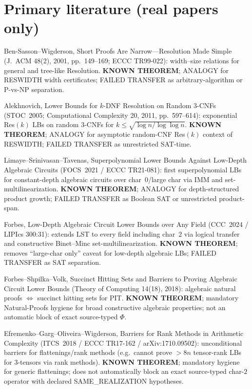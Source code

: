 \documentclass[11pt]{article}
\begin{document}
\section*{Primary literature (real papers only)}
Ben-Sasson--Wigderson, Short Proofs Are Narrow---Resolution Made Simple (J.\ ACM 48(2),
2001, pp.~149--169; ECCC TR99-022): width--size relations for general and tree-like Resolution.
\textbf{KNOWN THEOREM}; ANALOGY for RESWIDTH width certificates; FAILED TRANSFER as
arbitrary-algorithm or P-vs-NP separation.

Alekhnovich, Lower Bounds for $k$-DNF Resolution on Random 3-CNFs (STOC~2005;
Computational Complexity 20, 2011, pp.~597--614): exponential Res$(k)$ LBs on random 3-CNFs
for $k\le\sqrt{\log n/\log\log n}$. \textbf{KNOWN THEOREM}; ANALOGY for asymptotic random-CNF
Res$(k)$ context of RESWIDTH; FAILED TRANSFER as unrestricted SAT-time.

Limaye--Srinivasan--Tavenas, Superpolynomial Lower Bounds Against Low-Depth Algebraic Circuits
(FOCS~2021 / ECCC TR21-081): first superpolynomial LBs for constant-depth algebraic circuits
over char~$0$/large char via IMM and set-multilinearization. \textbf{KNOWN THEOREM}; ANALOGY
for depth-structured product growth; FAILED TRANSFER as Boolean SAT or unrestricted product-span.

Forbes, Low-Depth Algebraic Circuit Lower Bounds over Any Field (CCC~2024 / LIPIcs 300:31):
extends LST to every field including char~$2$ via logical transfer and constructive
Binet--Minc set-multilinearization. \textbf{KNOWN THEOREM}; removes ``large-char only''
caveat for low-depth algebraic LBs; FAILED TRANSFER as SAT separation.

Forbes--Shpilka--Volk, Succinct Hitting Sets and Barriers to Proving Algebraic Circuit Lower
Bounds (Theory of Computing 14(18), 2018): algebraic natural proofs $\Leftrightarrow$ succinct
hitting sets for PIT. \textbf{KNOWN THEOREM}; mandatory Natural-Proofs hygiene for broad
constructive algebraic properties; not an automatic block of exact source-typed $\Phi$.

Efremenko--Garg--Oliveira--Wigderson, Barriers for Rank Methods in Arithmetic Complexity
(ITCS~2018 / ECCC TR17-162 / arXiv:1710.09502): unconditional barriers for flattenings/rank
methods (e.g.\ cannot prove $>8n$ tensor-rank LBs for $3$-tensors via rank methods).
\textbf{KNOWN THEOREM}; mandatory hygiene for generic flattenings; does not automatically
block an exact source-typed char-$2$ operator with declared SAME\_REALIZATION hypotheses.
\end{document}

